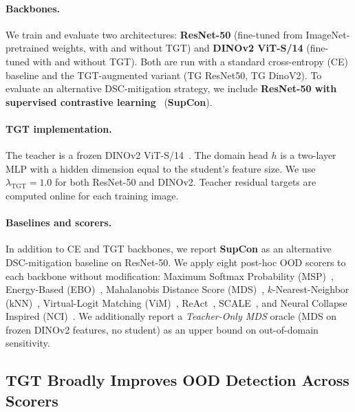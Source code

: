 \documentclass[runningheads]{llncs}
\begin{document}
\paragraph{Backbones.}
We train and evaluate two architectures: \textbf{ResNet-50} (fine-tuned from ImageNet-pretrained weights, with and without TGT) and \textbf{DINOv2 ViT-S/14} (fine-tuned with and without TGT).
Both are run with a standard cross-entropy (CE) baseline and the TGT-augmented variant (TG ResNet50, TG DinoV2).
To evaluate an alternative DSC-mitigation strategy, we include \textbf{ResNet-50 with supervised contrastive learning}~\cite{Khosla2020supcon} (\textbf{SupCon}).

\paragraph{TGT implementation.}
The teacher is a frozen DINOv2 ViT-S/14~\cite{Oquab2024dinov2}.
The domain head $h$ is a two-layer MLP with a hidden dimension equal to the student's feature size.
We use $\lambda_{\mathrm{TGT}} = 1.0$ for both ResNet-50 and DINOv2.
Teacher residual targets are computed online for each training image.

\paragraph{Baselines and scorers.}
In addition to CE and TGT backbones, we report \textbf{SupCon} as an alternative DSC-mitigation baseline on ResNet-50.
We apply eight post-hoc OOD scorers to each backbone without modification:
Maximum Softmax Probability (MSP)~\cite{Hendrycks2017msp},
Energy-Based (EBO)~\cite{Liu2020energy},
Mahalanobis Distance Score (MDS)~\cite{Lee2018maha},
$k$-Nearest-Neighbor (kNN)~\cite{Sun2022knn},
Virtual-Logit Matching (ViM)~\cite{Wang2022vim},
ReAct~\cite{Sun2021react},
SCALE~\cite{Xu2024scale},
and Neural Collapse Inspired (NCI)~\cite{Liu2023nci}.
We additionally report a \emph{Teacher-Only MDS} oracle (MDS on frozen DINOv2 features, no student) as an upper bound on out-of-domain sensitivity.

\subsection{TGT Broadly Improves OOD Detection Across Scorers}
\label{sec:exp:main}
\end{document}
